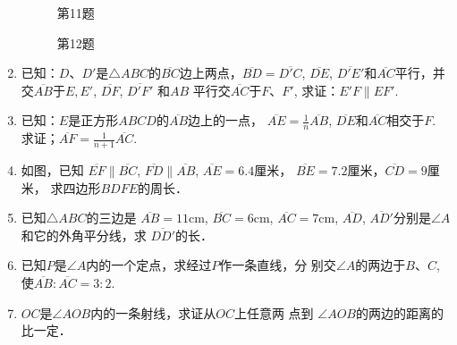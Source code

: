 \begin{enumerate}
\begin{figure}[htp]\centering
    \begin{minipage}[t]{0.48\textwidth}
    \centering
{}
    \caption*{第11题}
    \end{minipage}
    \begin{minipage}[t]{0.48\textwidth}
    \centering
    \caption*{第12题}
    \end{minipage}
    \end{figure}

\item 已知：$D$、$D'$是$\triangle ABC$的$\overline{BC}$边上两点，$\overline{BD}=\overline{D'C}$, 
$\overline{DE}$, $\overline{D'E'}$和$\overline{AC}$平行，并交$\overline{AB}$于$E,E'$, $\overline{DF}$, $\overline{D'F'}$ 和$AB$
平行交$\overline{AC}$于$F$、$F'$, 求证：$E'F\parallel EF'$.
\item 已知：$E$是正方形$ABCD$的$\overline{AB}$边上的一点，
$\overline{AE}=\frac{1}{n}\overline{AB}$, $\overline{DE}$和$\overline{AC}$相交于$F$. 求证；$\overline{AF}=\frac{1}{n+1}\overline{AC}$.
\item 如图，已知
$\overline{EF}\parallel \overline{BC}$, $\overline{FD}\parallel\overline{AB}$, $\overline{AE}=6.4$厘米，
$\overline{BE}=7.2$厘米，$\overline{CD}=9$厘米，
求四边形$BDFE$的周长．
\item 已知$\triangle ABC$的三边是
$\overline{AB}=11$cm, $\overline{BC}=6$cm,
$\overline{AC}=7$cm, $\overline{AD}$, $\overline{AD'}$分别是$\angle A$和它的外角平分线，求
$\overline{DD'}$的长．
\item 已知$P$是$\angle A$内的一个定点，求经过$P$作一条直线，分
别交$\angle A$的两边于$B$、$C$, 使$\overline{AB}:\overline{AC}=3:2$.
\item $OC$是$\angle AOB$内的一条射线，求证从$OC$上任意两 点到
$\angle AOB$的两边的距离的比一定．


\end{enumerate}
